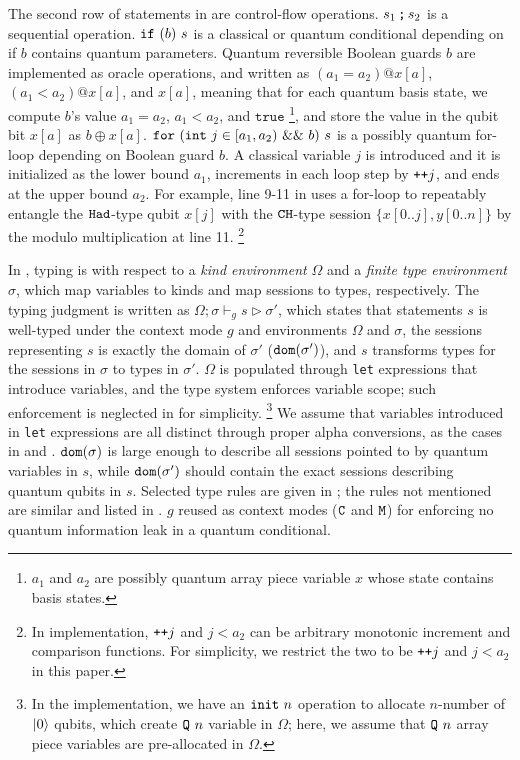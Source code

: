 The second row of statements in  are control-flow operations.
${s_1}\,\texttt{;}\,{s_2}$ is a sequential operation.
$\texttt{if}~{(b)}~{s}$ is a classical or quantum conditional depending on if $b$ contains quantum parameters.
Quantum reversible Boolean guards $b$ are implemented as \oqasm oracle operations, and written as $(a_1 = a_2) @ x[a]$, $(a_1 < a_2) @ x[a]$, and $x[a]$, meaning that for each quantum basis state, we compute $b$'s value $a_1 = a_2$, $a_1 < a_2$, and $\texttt{true}$ \footnote{$a_1$ and $a_2$ are possibly quantum array piece variable $x$ whose state contains basis states.}, and store the value in the qubit bit $x[a]$ as $b \oplus x[a]$.
$\texttt{for}~{(\texttt{int}~j \in [a_1,a_2)~\&\&~b)}~s$ is a possibly quantum for-loop depending on Boolean guard $b$.
A classical variable $j$ is introduced and it is initialized as the lower bound $a_1$, increments in each loop step by $\texttt{++}j$, and ends at the upper bound $a_2$.
For example, line 9-11 in  uses a for-loop to repeatably entangle the $\texttt{Had}$-type qubit $x[j]$ with the $\texttt{CH}$-type session $\{x[0..j],y[0..n]\}$ by the modulo multiplication at line 11. \footnote{In \qafny implementation, $\texttt{++}j$ and $j<a_2$ can be arbitrary monotonic increment and comparison functions. For simplicity, we restrict the two to be $\texttt{++}j$ and $j<a_2$ in this paper.}

In \qafny, typing is with respect to a \emph{kind environment} $\Omega$ and a \emph{finite type environment} $\sigma$,
which map \qafny variables to kinds and map sessions to types, respectively.
The typing judgment is written as $\Omega; \sigma\vdash_{g} s \triangleright \sigma'$,
which states that statements $s$ is well-typed under the context mode $g$ and environments $\Omega$ and $\sigma$,
the sessions representing $s$ is exactly the domain of $\sigma'$ ($\mathtt{dom}(\sigma')$),
and $s$ transforms types for the sessions in $\sigma$ to types in $\sigma'$.
$\Omega$ is populated through \texttt{let} expressions that introduce variables,
and the \qafny type system enforces variable scope; such enforcement is neglected in  for simplicity.
\footnote{In the \qafny implementation, we have an $\texttt{init}~{n}$ operation to allocate $n$-number of $\left\vert{0}\right\rangle$ qubits, which create $\texttt{Q}~n$ variable in $\Omega$; here, we assume that $\texttt{Q}~n$ array piece variables are pre-allocated in $\Omega$. }
We assume that variables introduced in \texttt{let} expressions are all distinct through proper alpha conversions, as the cases in  and .
$\mathtt{dom}(\sigma)$ is large enough to describe all sessions pointed to by quantum variables in $s$,
while $\mathtt{dom}(\sigma')$ should contain the exact sessions describing quantum qubits in $s$.
Selected type rules are given in ; the rules not mentioned are similar and listed in .
$g$ reused as context modes ($\texttt{C}$ and $\texttt{M}$) for enforcing no quantum information leak in a quantum conditional.

